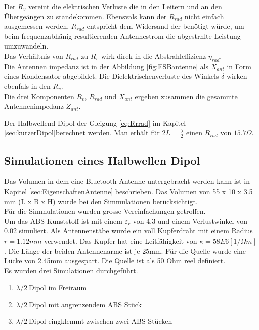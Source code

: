 Der $R_{v}$ vereint die elektrischen Verluste die in den Leitern und an den Übergeängen zu standekommen. Ebensvals kann der $R_{rad}$ nicht einfach ausgemessen werden, $R_{rad}$ entspricht dem Widersand der benötigt würde, um beim frequenzabhänig resultierenden Antennestrom die abgestrhlte Leistung umzuwandeln.\\
Das Verhältnis von $R_{rad}$  zu $R_{v}$ wirk direk in die Abstrahleffizienz $\eta_{rad}$. \\
Die Antennen impedanz ist in der Abbildung \ref{fig:ESBantenne} als $X_{ant}$ in Form eines Kondensator abgebildet. Die Dielektrischenverluste des Winkels $\delta$ wirken ebenfals in den $R_{v}$.\\
Die drei Komponenten $R_{v}$, $R_{rad}$ und $X_{ant}$ ergeben zusammen die gesammte Antennenimpedanz $Z_{ant}$.


Der Halbwellend Dipol der Gleigung \ref{eq:Rrrad} im Kapitel \ref{sec:kurzerDipol}berechnet werden. Man erhält für $2L = \frac{\lambda}{2}$ einen $R_{rad}$ von $15.7 \Omega $.

\subsection{Simulationen eines Halbwellen Dipol}

Das Volumen in dem eine Bluetooth Antenne untergebracht werden kann ist in Kapitel \ref{sec:EigenschaftenAntenne} beschrieben. Das Volumen von 55 x 10 x 3.5 mm (L x B x H) wurde bei den Simmulationen berücksichtigt. \\
Für die Simmulationen wurden grosse Vereinfachungen getroffen.\\
Um das ABS Kunststoff ist mit einem $\varepsilon_r $ von 4.3 und einem Verlustwinkel von 0.02 simuliert. Als Antennenstäbe wurde ein voll Kupferdraht mit einem Radius $r = 1.12 mm$ verwendet. Das Kupfer hat eine Leitfähigkeit von $\kappa=58E6 [1/\Omega m]$ . Die Länge der beiden Antennenarme ist je 25mm. Für die Quelle wurde eine Lücke von 2.45mm ausgespart. Die Quelle ist als 50 Ohm reel definiert.\\ 
Es wurden drei Simulationen durchgeführt.
\begin{enumerate}
\item  $\lambda/2 \ $Dipol im Freiraum
\item  $\lambda/2 \ $Dipol mit angrenzendem ABS Stück
\item  $\lambda/2 \ $Dipol eingklemmt zwischen zwei ABS Stücken
\end{enumerate}

